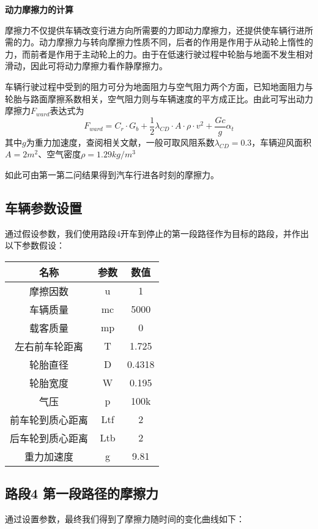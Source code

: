\documentclass[withoutpreface,bwprint]{cumcmthesis} %
\begin{document}
\textbf{动力摩擦力的计算}


摩擦力不仅提供车辆改变行进方向所需要的力即动力摩擦力，还提供使车辆行进所需的力。动力摩擦力与转向摩擦力性质不同，后者的作用是作用于从动轮上惰性的力，而前者是作用于主动轮上的力。由于在低速行驶过程中轮胎与地面不发生相对滑动，因此可将动力摩擦力看作静摩擦力。

车辆行驶过程中受到的阻力可分为地面阻力与空气阻力两个方面，已知地面阻力与轮胎与路面摩擦系数相关，空气阻力则与车辆速度的平方成正比。由此可写出动力摩擦力$F_{ward}$表达式为
\begin{equation}
    F_{ward} = C_r \cdot G_b + \frac{1}{2}\lambda_{CD}\cdot A \cdot\rho \cdot v^2 + \frac{Gc}{g}\alpha_t
\end{equation}
其中$g$为重力加速度，查阅相关文献，一般可取风阻系数$\lambda_{CD}=0.3$，车辆迎风面积$A=2m^2$、空气密度$\rho=1.29kg/m^3$

如此可由第一第二问结果得到汽车行进各时刻的摩擦力。

\subsection{车辆参数设置}
通过假设参数，我们使用路段4开车到停止的第一段路径作为目标的路段，并作出以下参数假设：

\begin{table}[htbp]
\centering
\begin{tabular}{ccc}
\hline
名称       & 参数  & 数值     \\ \hline
摩擦因数     & u   & 1      \\
车辆质量     & mc  & 5000   \\
载客质量     & mp  & 0      \\
左右前车轮距离  & T   & 1.725  \\
轮胎直径     & D   & 0.4318 \\
轮胎宽度     & W   & 0.195  \\
气压       & p   & 100k   \\
前车轮到质心距离 & Ltf & 2      \\
后车轮到质心距离 & Ltb & 2      \\
重力加速度    & g   & 9.81   \\ \hline
\end{tabular}
\end{table}


\subsection{路段4 第一段路径的摩擦力}
通过设置参数，最终我们得到了摩擦力随时间的变化曲线如下：
\end{document}
